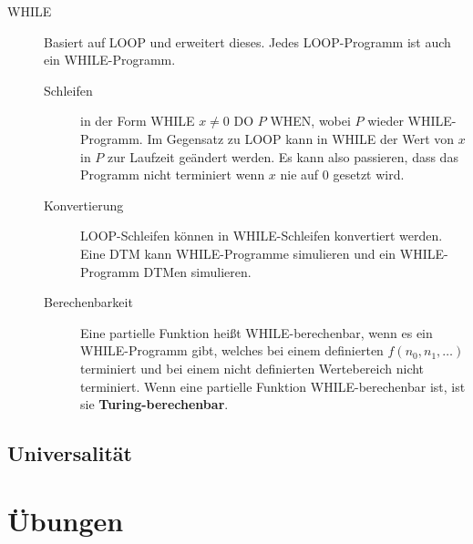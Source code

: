 \documentclass[a4paper,10pt]{article}
\newcommand{\f}[1]{\textbf{#1}}
\begin{document}
\begin{description}
		\item[WHILE] Basiert auf LOOP und erweitert dieses. Jedes LOOP-Programm ist auch ein WHILE-Programm. 
			\begin{description}
				\item[Schleifen] in der Form WHILE $x \neq 0$ DO $P$ WHEN, wobei $P$ wieder WHILE-Programm. Im Gegensatz zu LOOP kann in WHILE der Wert von $x$ in $P$ zur Laufzeit geändert werden. Es kann also passieren, dass das Programm nicht terminiert wenn $x$ nie auf $0$ gesetzt wird.
				\item[Konvertierung] LOOP-Schleifen können in WHILE-Schleifen konvertiert werden. Eine DTM kann WHILE-Programme simulieren und ein WHILE-Programm DTMen simulieren.
				\item[Berechenbarkeit] Eine partielle Funktion heißt WHILE-berechenbar, wenn es ein WHILE-Programm gibt, welches bei einem definierten $f(n_0,n_1,…)$ terminiert und bei einem nicht definierten Wertebereich nicht terminiert. Wenn eine partielle Funktion WHILE-berechenbar ist, ist sie \f{Turing-berechenbar}. 
			\end{description}
			
    \end{description}
    
    \subsection{Universalität}
    
    \newpage
    \section{Übungen}
\end{document}
